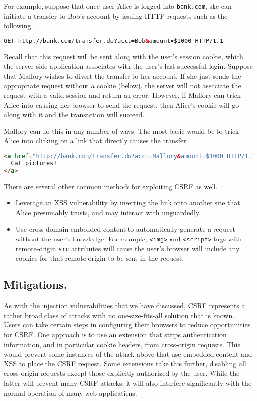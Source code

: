 \documentclass[11pt,twoside]{scrartcl}
\begin{document}
For example, suppose that once user Alice is logged into \verb'bank.com', she can initiate a transfer to Bob's account by issuing HTTP requests such as the following.
\begin{lstlisting}[language=xml]
GET http://bank.com/transfer.do?acct=Bob&amount=$1000 HTTP/1.1
\end{lstlisting}
Recall that this request will be sent along with the user's session cookie, which the server-side application associates with the user's last successful login. Suppose that Mallory wishes to divert the transfer to her account. If she just sends the appropriate request without a cookie (below), the server will not associate the request with a valid session and return an error. However, if Mallory can trick Alice into causing her browser to send the request, then Alice's cookie will go along with it and the transaction will succeed.

Mallory can do this in any number of ways. The most basic would be to trick Alice into clicking on a link that directly causes the transfer.
\begin{lstlisting}[language=HTML]
<a href="http://bank.com/transfer.do?acct=Mallory&amount=$1000 HTTP/1.1">
  Cat pictures!
</a>
\end{lstlisting}
There are several other common methods for exploiting CSRF as well.
\begin{itemize}
\item Leverage an XSS vulnerability by inserting the link onto another site that Alice presumably trusts, and may interact with unguardedly. 
\item Use cross-domain embedded content to automatically generate a request without the user's knowledge. For example, \verb'<img>' and \verb'<script>' tags with remote-origin \verb'src' attributes will cause the user's browser will include any cookies for that remote origin to be sent in the request.
\end{itemize}

\subsection{Mitigations.} As with the injection vulnerabilities that we have discussed, CSRF represents a rather broad class of attacks with no one-size-fits-all solution that is known. Users can take certain steps in configuring their browsers to reduce opportunities for CSRF. One approach is to use an extension that strips authentication information, and in particular cookie headers, from cross-origin requests. This would prevent some instances of the attack above that use embedded content and XSS to place the CSRF request. Some extensions take this further, disabling all cross-origin requests except those  explicitly authorized by the user. While the latter will prevent many CSRF attacks, it will also interfere significantly with the normal operation of many web applications.
\end{document}
